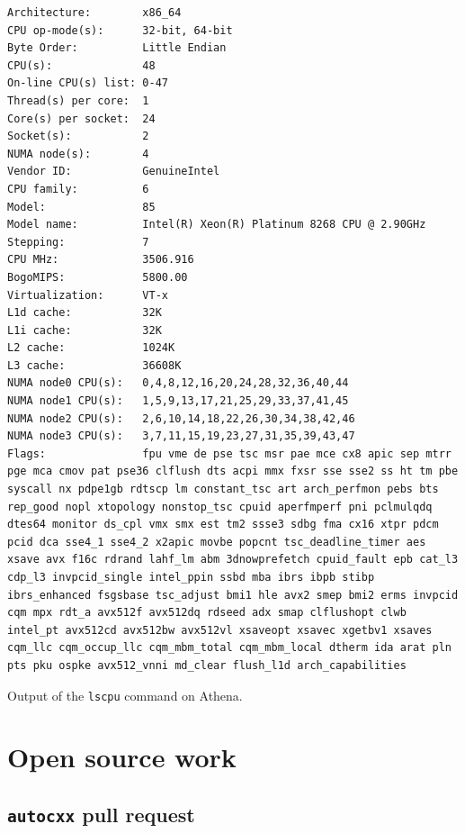 \begin{code}
    \begin{verbatim}
Architecture:        x86_64
CPU op-mode(s):      32-bit, 64-bit
Byte Order:          Little Endian
CPU(s):              48
On-line CPU(s) list: 0-47
Thread(s) per core:  1
Core(s) per socket:  24
Socket(s):           2
NUMA node(s):        4
Vendor ID:           GenuineIntel
CPU family:          6
Model:               85
Model name:          Intel(R) Xeon(R) Platinum 8268 CPU @ 2.90GHz
Stepping:            7
CPU MHz:             3506.916
BogoMIPS:            5800.00
Virtualization:      VT-x
L1d cache:           32K
L1i cache:           32K
L2 cache:            1024K
L3 cache:            36608K
NUMA node0 CPU(s):   0,4,8,12,16,20,24,28,32,36,40,44
NUMA node1 CPU(s):   1,5,9,13,17,21,25,29,33,37,41,45
NUMA node2 CPU(s):   2,6,10,14,18,22,26,30,34,38,42,46
NUMA node3 CPU(s):   3,7,11,15,19,23,27,31,35,39,43,47
Flags:               fpu vme de pse tsc msr pae mce cx8 apic sep mtrr pge mca cmov pat pse36 clflush dts acpi mmx fxsr sse sse2 ss ht tm pbe syscall nx pdpe1gb rdtscp lm constant_tsc art arch_perfmon pebs bts rep_good nopl xtopology nonstop_tsc cpuid aperfmperf pni pclmulqdq dtes64 monitor ds_cpl vmx smx est tm2 ssse3 sdbg fma cx16 xtpr pdcm pcid dca sse4_1 sse4_2 x2apic movbe popcnt tsc_deadline_timer aes xsave avx f16c rdrand lahf_lm abm 3dnowprefetch cpuid_fault epb cat_l3 cdp_l3 invpcid_single intel_ppin ssbd mba ibrs ibpb stibp ibrs_enhanced fsgsbase tsc_adjust bmi1 hle avx2 smep bmi2 erms invpcid cqm mpx rdt_a avx512f avx512dq rdseed adx smap clflushopt clwb intel_pt avx512cd avx512bw avx512vl xsaveopt xsavec xgetbv1 xsaves cqm_llc cqm_occup_llc cqm_mbm_total cqm_mbm_local dtherm ida arat pln pts pku ospke avx512_vnni md_clear flush_l1d arch_capabilities
    \end{verbatim}
    \caption{Output of the \texttt{lscpu} command on Athena.}
    \label{listing:avon-lscpu}
\end{code}

\chapter{Open source work}
\label{ch:open-source-appendix}

\section{\texttt{autocxx} pull request}
\label{sec:autocxx-pull-request-appendix}

